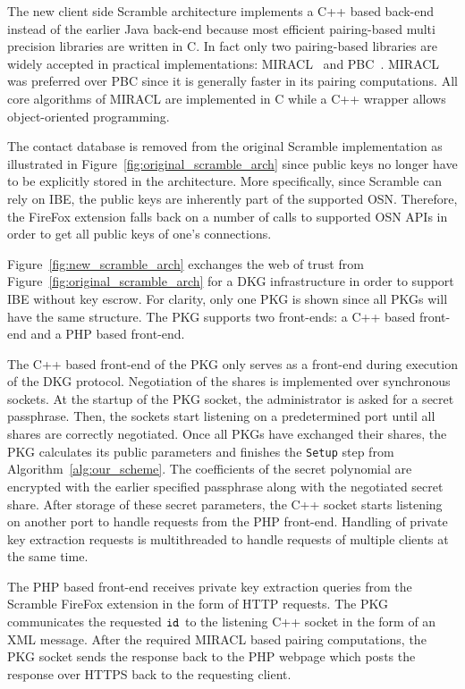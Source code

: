 The new client side Scramble architecture implements a C++ based back-end instead of the earlier Java back-end because most efficient pairing-based multi precision libraries are written in C. In fact only two pairing-based libraries are widely accepted in practical implementations: MIRACL~\cite{art:Scott03} and PBC~\cite{thesis:Lynn07}. MIRACL was preferred over PBC since it is generally faster in its pairing computations. All core algorithms of MIRACL are implemented in C while a C++ wrapper allows object-oriented programming.

The contact database is removed from the original Scramble implementation as illustrated in Figure~\ref{fig:original_scramble_arch} since public keys no longer have to be explicitly stored in the architecture. More specifically, since Scramble can rely on IBE, the public keys are inherently part of the supported OSN. Therefore, the FireFox extension falls back on a number of calls to supported OSN APIs in order to get all public keys of one's connections.

Figure~\ref{fig:new_scramble_arch} exchanges the web of trust from Figure~\ref{fig:original_scramble_arch} for a DKG infrastructure in order to support IBE without key escrow. For clarity, only one PKG is shown since all PKGs will have the same structure. The PKG supports two front-ends: a C++ based front-end and a PHP based front-end. 

The C++ based front-end of the PKG only serves as a front-end during execution of the DKG protocol. Negotiation of the shares is implemented over synchronous sockets. At the startup of the PKG socket, the administrator is asked for a secret passphrase. Then, the sockets start listening on a predetermined port until all shares are correctly negotiated. Once all PKGs have exchanged their shares, the PKG calculates its public parameters and finishes the \texttt{Setup} step from Algorithm~\ref{alg:our_scheme}. The coefficients of the secret polynomial are encrypted with the earlier specified passphrase along with the negotiated secret share. After storage of these secret parameters, the C++ socket starts listening on another port to handle requests from the PHP front-end. Handling of private key extraction requests is multithreaded to handle requests of multiple clients at the same time.

The PHP based front-end receives private key extraction queries from the Scramble FireFox extension in the form of HTTP requests. The PKG communicates the requested $\mathtt{id}_{}$ to the listening C++ socket in the form of an XML message. After the required MIRACL based pairing computations, the PKG socket sends the response back to the PHP webpage which posts the response over HTTPS back to the requesting client.

